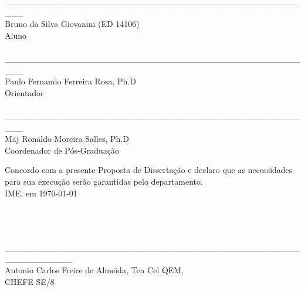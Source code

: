 \documentclass[a4paper, 12pt]{article}
\begin{document}
\newpage


 

\newpage

\begin{center}
\_\_\_\_\_\_\_\_\_\_\_\_\_\_\_\_\_\_\_\_\_\_\_\_\_\_\_\_\_\_\_\_\_\_\_\_\_\_\_\_\_\_\_\_\_\_\_\_\_\_\_ \\

Bruno da Silva Giovanini (ED 14106) \\Aluno \\ 
 
\hspace{4cm}
\\


\_\_\_\_\_\_\_\_\_\_\_\_\_\_\_\_\_\_\_\_\_\_\_\_\_\_\_\_\_\_\_\_\_\_\_\_\_\_\_\_\_\_\_\_\_\_\_\_\_\_\_ \\
Paulo Fernando Ferreira Rosa, Ph.D \\Orientador \\ 

\hspace{4cm}
\\


\_\_\_\_\_\_\_\_\_\_\_\_\_\_\_\_\_\_\_\_\_\_\_\_\_\_\_\_\_\_\_\_\_\_\_\_\_\_\_\_\_\_\_\_\_\_\_\_\_\_\_ \\
Maj Ronaldo Moreira Salles, Ph.D \\Coordenador de Pós-Graduação \\

\hspace{4cm}

\end{center}
Concordo com a presente Proposta de Dissertação e declaro que as necessidades para sua execução serão garantidas pelo departamento. \\
IME, em \today
 \hspace{4cm}
 \\
 \\
 \\
 \\
 
\begin{center}
\_\_\_\_\_\_\_\_\_\_\_\_\_\_\_\_\_\_\_\_\_\_\_\_\_\_\_\_\_\_\_\_\_\_\_\_\_\_\_\_\_\_\_\_\_\_\_\_\_\_\_\_\_\_\_\_\_\_\_ \\
Antonio Carlos Freire de Almeida, Ten Cel QEM, \\
CHEFE SE/8
\end{center}
\end{document}

